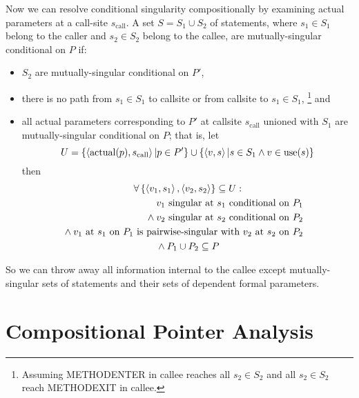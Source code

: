 \documentclass[11pt,notitlepage]{article}
\begin{document}
Now we can resolve conditional singularity compositionally by
examining actual parameters at a call-site $s_\text{call}$.
A set $S=S_1 \cup S_2$ of statements,
where $s_1\in S_1$ belong to the caller and $s_2\in S_2$ belong to the
callee, are mutually-singular conditional on $P$ if:
\begin{itemize}
\item $S_2$ are mutually-singular conditional on $P'$,
\item there is no path from $s_1 \in S_1$ to callsite or
             from callsite to $s_1\in S_1$,%
\footnote{Assuming METHODENTER in callee reaches all $s_2\in S_2$ and
          all $s_2\in S_2$ reach METHODEXIT in callee.}
and
\item all actual parameters corresponding to $P'$ at callsite $s_\text{call}$
  unioned with $S_1$ are mutually-singular conditional on $P$; that is, let
\begin{displaymath}
U = 
\left\{\left\langle \text{actual}(p), s_\text{call} \right\rangle | p \in P' \right\}
    \cup
\left\{\left\langle v,s \right\rangle|s\in S_1 \wedge v\in \text{use}(s)\right\}
\end{displaymath}
then
\begin{multline*}
\forall \left\{\tuple{v_1,s_1},\tuple{v_2,s_2}\right\} \subseteq U :
\\\shoveright{
v_1 \text{ singular at } s_1 \text{ conditional on } P_1
}\\\shoveright{{}\wedge
v_2 \text{ singular at } s_2 \text{ conditional on } P_2
}\\\shoveright{{}\wedge
v_1 \text{ at } s_1 \text{ on } P_1
\text{ is pairwise-singular with }
v_2 \text{ at } s_2 \text{ on } P_2
}\\{}\wedge
P_1 \cup P_2 \subseteq P
\end{multline*}
\end{itemize}

So we can throw away all information internal to the callee except
mutually-singular sets of statements and their sets of dependent
formal parameters.


\section{Compositional Pointer Analysis}
\end{document}

